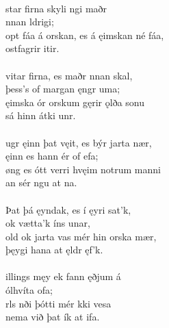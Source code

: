  \\

\bva {}star firna \hld skyli ngi maðr \\%
\ind {}nnan ldrigi; \\%
opt fáa á orskan, \hld es á ęimskan né fáa, \\%
\ind {}ostfagrir itir.\\%

 \\

\bva {}vitar firna, \hld es maðr nnan skal, \\%
\ind þess's of margan ęngr uma; \\%
ęimska ór orskum \hld gęrir ǫlða sonu \\%
\ind sá hinn átki unr.\\%

 \\

\bva {}ugr ęinn þat vęit, \hld es býr jarta nær, \\%
\ind ęinn es hann ér of efa; \\%
øng es ótt verri \hld hvęim notrum manni \\%
\ind an sér ngu at na.\\%

 \\

\bva Þat þá ęyndak, \hld es í ęyri sat'k, \\%
\ind ok vætta'k íns unar, \\%
old ok jarta \hld vas mér hin orska mær, \\%
\ind þęygi hana at ęldr ęf'k.\\%

 \\

\bva {}illings męy \hld ek fann ęðjum á \\%
\ind {}ólhvíta ofa; \\%
rls nði \hld þótti mér kki vesa \\%
\ind nema við þat ík at ifa.\\%

 \\

